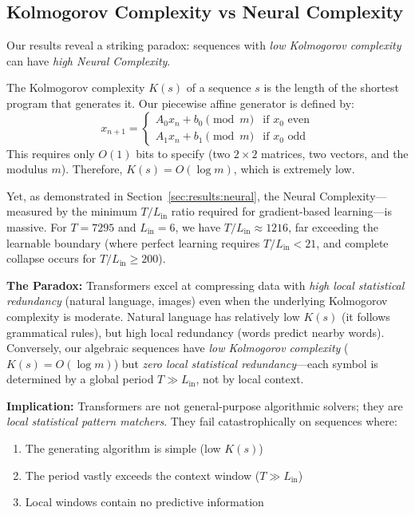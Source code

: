 \documentclass[11pt]{article}
\theoremstyle{plain}
\theoremstyle{definition}
\begin{document}
\subsection{Kolmogorov Complexity vs Neural Complexity}

Our results reveal a striking paradox: sequences with \emph{low Kolmogorov complexity} can have \emph{high Neural Complexity}. 

The Kolmogorov complexity $K(s)$ of a sequence $s$ is the length of the shortest program that generates it. Our piecewise affine generator is defined by:
\begin{equation}
x_{n+1} = \begin{cases}
A_0 x_n + b_0 \pmod{m} & \text{if } x_0 \text{ even} \\
A_1 x_n + b_1 \pmod{m} & \text{if } x_0 \text{ odd}
\end{cases}
\end{equation}
This requires only $O(1)$ bits to specify (two $2 \times 2$ matrices, two vectors, and the modulus $m$). Therefore, $K(s) = O(\log m)$, which is extremely low.

Yet, as demonstrated in Section~\ref{sec:results:neural}, the Neural Complexity---measured by the minimum $T/L_{\mathrm{in}}$ ratio required for gradient-based learning---is massive. For $T=7295$ and $L_{\mathrm{in}}=6$, we have $T/L_{\mathrm{in}} \approx 1216$, far exceeding the learnable boundary (where perfect learning requires $T/L_{\mathrm{in}} < 21$, and complete collapse occurs for $T/L_{\mathrm{in}} \ge 200$).

\textbf{The Paradox:} Transformers excel at compressing data with \emph{high local statistical redundancy} (natural language, images) even when the underlying Kolmogorov complexity is moderate. Natural language has relatively low $K(s)$ (it follows grammatical rules), but high local redundancy (words predict nearby words). Conversely, our algebraic sequences have \emph{low Kolmogorov complexity} ($K(s) = O(\log m)$) but \emph{zero local statistical redundancy}---each symbol is determined by a global period $T \gg L_{\mathrm{in}}$, not by local context.

\textbf{Implication:} Transformers are not general-purpose algorithmic solvers; they are \emph{local statistical pattern matchers}. They fail catastrophically on sequences where:
\begin{enumerate}[leftmargin=2em]
\item The generating algorithm is simple (low $K(s)$)
\item The period vastly exceeds the context window ($T \gg L_{\mathrm{in}}$)
\item Local windows contain no predictive information
\end{enumerate}
\end{document}
